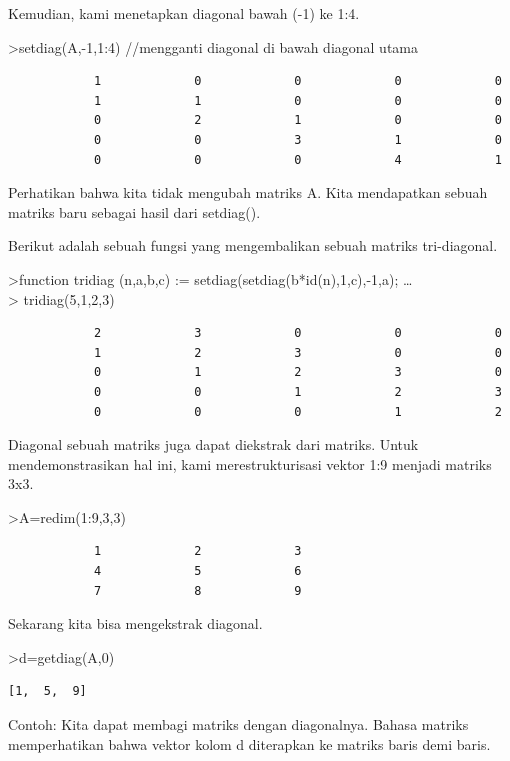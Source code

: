 \documentclass[
]{book}
\begin{document}
Kemudian, kami menetapkan diagonal bawah (-1) ke 1:4.

\textgreater setdiag(A,-1,1:4) //mengganti diagonal di bawah diagonal utama

\begin{verbatim}
            1             0             0             0             0 
            1             1             0             0             0 
            0             2             1             0             0 
            0             0             3             1             0 
            0             0             0             4             1 
\end{verbatim}

Perhatikan bahwa kita tidak mengubah matriks A. Kita mendapatkan sebuah matriks baru sebagai hasil dari setdiag().

Berikut adalah sebuah fungsi yang mengembalikan sebuah matriks tri-diagonal.

\textgreater function tridiag (n,a,b,c) := setdiag(setdiag(b*id(n),1,c),-1,a); \ldots{}\\
\textgreater{} tridiag(5,1,2,3)

\begin{verbatim}
            2             3             0             0             0 
            1             2             3             0             0 
            0             1             2             3             0 
            0             0             1             2             3 
            0             0             0             1             2 
\end{verbatim}

Diagonal sebuah matriks juga dapat diekstrak dari matriks. Untuk mendemonstrasikan hal ini, kami merestrukturisasi vektor 1:9 menjadi matriks 3x3.

\textgreater A=redim(1:9,3,3)

\begin{verbatim}
            1             2             3 
            4             5             6 
            7             8             9 
\end{verbatim}

Sekarang kita bisa mengekstrak diagonal.

\textgreater d=getdiag(A,0)

\begin{verbatim}
[1,  5,  9]
\end{verbatim}

Contoh: Kita dapat membagi matriks dengan diagonalnya. Bahasa matriks memperhatikan bahwa vektor kolom d diterapkan ke matriks baris demi baris.
\end{document}
